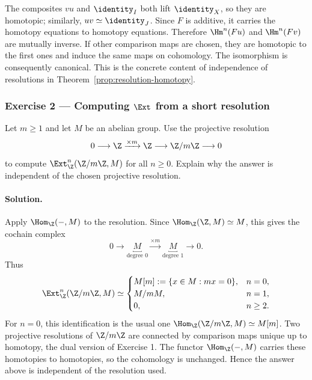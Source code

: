 The composites $vu$ and $\identity_I$ both lift $\identity_X$, so they are
homotopic; similarly, $uv\simeq\identity_J$. Since $F$ is additive, it
carries the homotopy equations to homotopy equations. Therefore
$\Hm^n(Fu)$ and $\Hm^n(Fv)$ are mutually inverse. If other comparison maps
are chosen, they are homotopic to the first ones and induce the same maps on
cohomology. The isomorphism is consequently canonical. This is the concrete
content of independence of resolutions in
Theorem~\ref{prop:resolution-homotopy}.

\subsubsection*{Exercise 2 --- Computing $\Ext$ from a short resolution}
\hypertarget{o014.mastery.derived-spectral.002.ex02}{ }
\label{mastery:derived-spectral-002-ex02}

Let $m\geq1$ and let $M$ be an abelian group. Use the projective resolution
\[
	0\longrightarrow\Z\xrightarrow{\times m}\Z
	\longrightarrow\Z/m\Z\longrightarrow0
\]
to compute $\Ext^n_{\Z}(\Z/m\Z,M)$ for all $n\geq0$. Explain why the
answer is independent of the chosen projective resolution.

\paragraph{Solution.}
\hypertarget{o014.mastery.derived-spectral.002.sol02}{ }
Apply $\Hom_{\Z}(-,M)$ to the resolution. Since
$\Hom_{\Z}(\Z,M)\simeq M$, this gives the cochain complex
\[
	0\longrightarrow
	\underbracket{M}_{\text{degree }0}
	\xrightarrow{\times m}
	\underbracket{M}_{\text{degree }1}
	\longrightarrow0.
\]
Thus
\[
	\Ext^n_{\Z}(\Z/m\Z,M)\simeq
	\begin{cases}
		M[m]:=\{x\in M:mx=0\},&n=0,\\
		M/mM,&n=1,\\
		0,&n\geq2.
	\end{cases}
\]
For $n=0$, this identification is the usual one
$\Hom_{\Z}(\Z/m\Z,M)\simeq M[m]$. Two projective resolutions of
$\Z/m\Z$ are connected by comparison maps unique up to homotopy, the dual
version of Exercise 1. The functor $\Hom_{\Z}(-,M)$ carries these homotopies
to homotopies, so the cohomology is unchanged. Hence the answer above is
independent of the resolution used.

